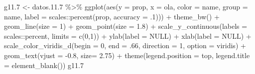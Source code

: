 \documentclass[
  12pt,
]{book}
\newenvironment{Shaded}{\begin{snugshade}}{\end{snugshade}}
\newcommand{\AttributeTok}[1]{\textcolor[rgb]{0.77,0.63,0.00}{#1}}
\newcommand{\ConstantTok}[1]{\textcolor[rgb]{0.00,0.00,0.00}{#1}}
\newcommand{\DecValTok}[1]{\textcolor[rgb]{0.00,0.00,0.81}{#1}}
\newcommand{\FloatTok}[1]{\textcolor[rgb]{0.00,0.00,0.81}{#1}}
\newcommand{\FunctionTok}[1]{\textcolor[rgb]{0.00,0.00,0.00}{#1}}
\newcommand{\NormalTok}[1]{#1}
\newcommand{\OtherTok}[1]{\textcolor[rgb]{0.56,0.35,0.01}{#1}}
\newcommand{\SpecialCharTok}[1]{\textcolor[rgb]{0.00,0.00,0.00}{#1}}
\newcommand{\StringTok}[1]{\textcolor[rgb]{0.31,0.60,0.02}{#1}}
\begin{document}
\begin{Shaded}
\begin{Highlighting}[]
\NormalTok{g11}\FloatTok{.7} \OtherTok{\textless{}{-}}\NormalTok{ datos.}\FloatTok{11.7} \SpecialCharTok{\%\textgreater{}\%} 
  \FunctionTok{ggplot}\NormalTok{(}\FunctionTok{aes}\NormalTok{(}\AttributeTok{y =}\NormalTok{ prop, }\AttributeTok{x =}\NormalTok{ ola, }\AttributeTok{color =}\NormalTok{ name, }\AttributeTok{group =}\NormalTok{ name,}
             \AttributeTok{label =}\NormalTok{ scales}\SpecialCharTok{::}\FunctionTok{percent}\NormalTok{(prop, }\AttributeTok{accuracy =}\NormalTok{ .}\DecValTok{1}\NormalTok{))) }\SpecialCharTok{+}
  \FunctionTok{theme\_bw}\NormalTok{() }\SpecialCharTok{+}   
  \FunctionTok{geom\_line}\NormalTok{(}\AttributeTok{size =} \DecValTok{1}\NormalTok{) }\SpecialCharTok{+}
  \FunctionTok{geom\_point}\NormalTok{(}\AttributeTok{size =} \FloatTok{1.8}\NormalTok{) }\SpecialCharTok{+}
  \FunctionTok{scale\_y\_continuous}\NormalTok{(}\AttributeTok{labels =}\NormalTok{ scales}\SpecialCharTok{::}\NormalTok{percent,}
                     \AttributeTok{limits =} \FunctionTok{c}\NormalTok{(}\DecValTok{0}\NormalTok{,}\DecValTok{1}\NormalTok{)) }\SpecialCharTok{+}
  \FunctionTok{ylab}\NormalTok{(}\AttributeTok{label =} \ConstantTok{NULL}\NormalTok{) }\SpecialCharTok{+}
  \FunctionTok{xlab}\NormalTok{(}\AttributeTok{label =} \ConstantTok{NULL}\NormalTok{) }\SpecialCharTok{+}
  \FunctionTok{scale\_color\_viridis\_d}\NormalTok{(}\AttributeTok{begin =} \DecValTok{0}\NormalTok{, }\AttributeTok{end =}\NormalTok{ .}\DecValTok{66}\NormalTok{, }\AttributeTok{direction =} \DecValTok{1}\NormalTok{, }\AttributeTok{option =} \StringTok{\textquotesingle{}viridis\textquotesingle{}}\NormalTok{) }\SpecialCharTok{+}
  \FunctionTok{geom\_text}\NormalTok{(}\AttributeTok{vjust =} \SpecialCharTok{{-}}\FloatTok{0.8}\NormalTok{,}
            \AttributeTok{size=} \FloatTok{2.75}\NormalTok{) }\SpecialCharTok{+}
  \FunctionTok{theme}\NormalTok{(}\AttributeTok{legend.position =} \StringTok{\textquotesingle{}top\textquotesingle{}}\NormalTok{,}
        \AttributeTok{legend.title =} \FunctionTok{element\_blank}\NormalTok{())}
\NormalTok{g11}\FloatTok{.7}
\end{Highlighting}
\end{Shaded}
\end{document}
